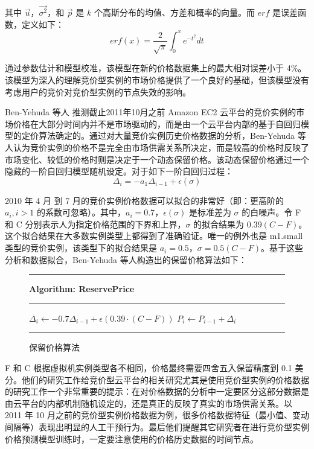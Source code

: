 其中 $\vec u$，$\vec{\sigma^2}$，和 $\vec p$ 是 $k$ 个高斯分布的均值、方差和概率的向量。而 $erf$ 是误差函数，定义如下：
\begin{equation}\label{eq_erf}\nonumber 
erf(x) = \frac{2}{\sqrt{\pi}}\int_{0}^{x} e^{-t^2}dt
\end{equation}

通过参数估计和模型校准，该模型在新的价格数据集上的最大相对误差小于 4\%。该模型为深入的理解竞价型实例的市场价格提供了一个良好的基础，但该模型没有考虑用户的竞价对竞价型实例的节点失效的影响。

Ben-Yehuda 等人 \cite{AgmonBen-Yehuda:2013:DAE:2509413.2509416} 推测截止2011年10月之前 Amazon EC2 云平台的竞价实例的市场价格在大部分时间内并不是市场驱动的，而是由一个云平台内部的基于自回归模型的定价算法确定的。通过对大量竞价实例历史价格数据的分析，Ben-Yehuda 等人认为竞价实例的价格不是完全由市场供需关系所决定，而是较高的价格时反映了市场变化、较低的价格时则是决定于一个动态保留价格。该动态保留价格通过一个隐藏的一阶自回归模型随机设定。对于如下一阶自回归过程：
\begin{equation}\label{eq_ar1}\nonumber 
\Delta_i = - a_1\Delta_{i-1}+\epsilon(\sigma)
\end{equation}

2010 年 4 月 到 7 月的竞价实例价格数据可以拟合的非常好（即：更高阶的 $a_i, i > 1$ 的系数可忽略）。其中，$a_i = 0.7$，$\epsilon(\sigma)$ 是标准差为 $\sigma$ 的白噪声。令 F 和 C 分别表示人为指定价格范围的下界和上界，$\sigma$ 的拟合结果为 $0.39 (C - F)$。这个拟合结果在大多数实例类型上都得到了准确验证。唯一的例外也是 m1.small 类型的竞价实例，该类型下的拟合结果是 $a_i = 0.5$，$\sigma = 0.5 (C - F)$。基于这些分析和数据拟合，Ben-Yehuda 等人构造出的保留价格算法如下：
\begin{figure}
\rule[-.2pt]{0.9\textwidth}{0.9pt}

\textbf{Algorithm: ReservePrice}

\rule[-.2pt]{0.9\textwidth}{0.5pt}

\begin{algorithmic}[1]
\Repeat
    \State $\Delta_i\gets - 0.7 \Delta_{i-1}+\epsilon(0.39 \cdot (C - F))$
    \State $P_i\gets P_{i-1} + \Delta_i$
\end{algorithmic}
\rule[-.2pt]{0.9\textwidth}{0.8pt}
\caption{保留价格算法}\label{fig-reserveprice-algo}
\end{figure}

F 和 C 根据虚拟机实例类型各不相同，价格最终需要四舍五入保留精度到 0.1 美分。他们的研究工作给竞价型云平台的相关研究尤其是使用竞价型实例的价格数据的研究工作一个非常重要的提示：在对价格数据的分析中一定要区分这部分数据是由云平台的内部机制随机设定的，还是真正的反映了真实的市场供需关系。以 2011 年 10 月之前的竞价型实例价格数据为例，很多价格数据特征（最小值、变动间隔等）表现出明显的人工干预行为。最后他们提醒其它研究者在进行竞价型实例价格预测模型训练时，一定要注意使用的价格历史数据的时间节点。

